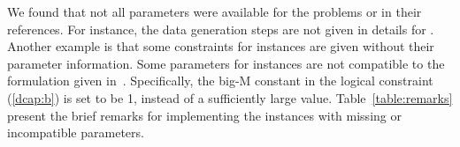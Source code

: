 We found that not all parameters were available for the problems or in their references.  For instance, the data generation steps are not given in details for {\mptsps}. Another example is that some constraints for {\sslp} instances are given without their parameter information. Some parameters for {\dcap} instances are not compatible to the formulation given in~\cite{journal:AG2004}. Specifically,  the big-M constant in the logical constraint (\ref{dcap:b}) is set to be 1, instead of a sufficiently large value. Table~\ref{table:remarks} present the brief remarks for implementing the instances with missing or incompatible parameters. 




